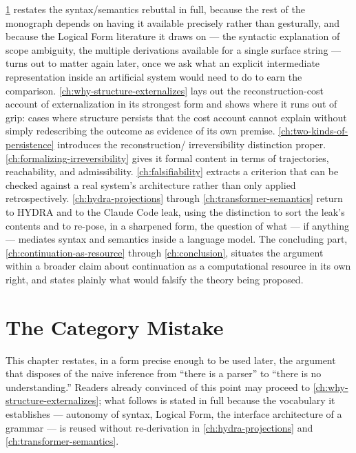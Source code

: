 \documentclass[11pt]{book}
\theoremstyle{plain}
\theoremstyle{definition}
\theoremstyle{remark}
\begin{document}
\cref{ch:category-mistake} restates the syntax/semantics rebuttal in
full, because the rest of the monograph depends on having it available
precisely rather than gesturally, and because the Logical Form
literature it draws on --- the syntactic explanation of scope
ambiguity, the multiple derivations available for a single surface
string --- turns out to matter again later, once we ask what an
explicit intermediate representation inside an artificial system would
need to do to earn the comparison. \cref{ch:why-structure-externalizes}
lays out the reconstruction-cost account of externalization in its
strongest form and shows where it runs out of grip: cases where
structure persists that the cost account cannot explain without simply
redescribing the outcome as evidence of its own premise.
\cref{ch:two-kinds-of-persistence} introduces the reconstruction/
irreversibility distinction proper. \cref{ch:formalizing-irreversibility}
gives it formal content in terms of trajectories, reachability, and
admissibility. \cref{ch:falsifiability} extracts a criterion that can
be checked against a real system's architecture rather than only
applied retrospectively. \cref{ch:hydra-projections} through
\cref{ch:transformer-semantics} return to HYDRA and to the Claude Code
leak, using the distinction to sort the leak's contents and to
re-pose, in a sharpened form, the question of what --- if anything ---
mediates syntax and semantics inside a language model. The concluding
part, \cref{ch:continuation-as-resource} through
\cref{ch:conclusion}, situates the argument within a broader claim
about continuation as a computational resource in its own right, and
states plainly what would falsify the theory being proposed.
\chapter{The Category Mistake}
\label{ch:category-mistake}

This chapter restates, in a form precise enough to be used later, the
argument that disposes of the naive inference from \enquote{there is a
parser} to \enquote{there is no understanding.} Readers already
convinced of this point may proceed to \cref{ch:why-structure-externalizes};
what follows is stated in full because the vocabulary it establishes
--- autonomy of syntax, Logical Form, the interface architecture of a
grammar --- is reused without re-derivation in
\cref{ch:hydra-projections} and \cref{ch:transformer-semantics}.
\end{document}
